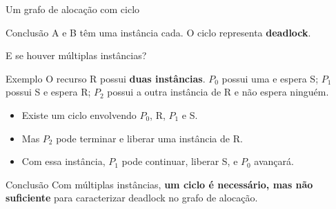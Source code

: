 \documentclass[aspectratio=169,11pt]{beamer}
\begin{document}
\begin{frame}{Um grafo de alocação com ciclo}
\centering
{}
\vspace{.15cm}
\begin{block}{Conclusão}
A e B têm uma instância cada. O ciclo representa \textbf{deadlock}.
\end{block}
\end{frame}

\begin{frame}{E se houver múltiplas instâncias?}
\small
\begin{block}{Exemplo}
O recurso R possui \textbf{duas instâncias}. $P_0$ possui uma e espera S; $P_1$ possui S e espera R; $P_2$ possui a outra instância de R e não espera ninguém.
\end{block}
\begin{itemize}
\item Existe um ciclo envolvendo $P_0$, R, $P_1$ e S.
\item Mas $P_2$ pode terminar e liberar uma instância de R.
\item Com essa instância, $P_1$ pode continuar, liberar S, e $P_0$ avançará.
\end{itemize}
\begin{alertblock}{Conclusão}
Com múltiplas instâncias, \textbf{um ciclo é necessário, mas não suficiente} para caracterizar deadlock no grafo de alocação.
\end{alertblock}
\end{frame}
\end{document}
